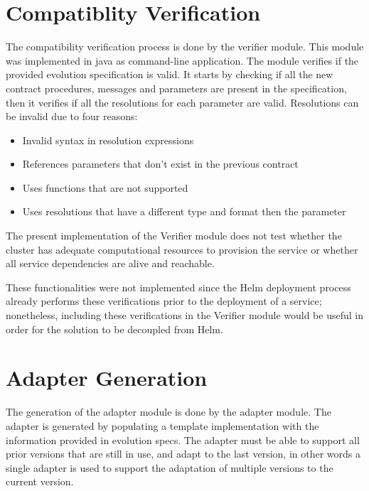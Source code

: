 \section{Compatiblity Verification} %
\label{sec:compatiblity_verification}

The compatibility verification process is done by the verifier module.
This module was implemented in java as command-line application.
The module verifies if the provided evolution specification is valid.
It starts by checking if all the new contract procedures, messages and parameters are present in the specification,
then it verifies if all the resolutions for each parameter are valid.
Resolutions can be invalid due to four reasons:

\begin{itemize}
    \item Invalid syntax in resolution expressions
    \item References parameters that don't exist in the previous contract
    \item Uses functions that are not supported
    \item Uses resolutions that have a different type and format then the parameter
\end{itemize}

The present implementation of the Verifier module does not test whether the cluster has adequate computational resources to provision the service or whether all service dependencies are alive and reachable.

These functionalities were not implemented since the Helm deployment process already performs these verifications prior to the deployment of a service;
nonetheless, including these verifications in the Verifier module would be useful in order for the solution to be decoupled from Helm.

\newpage

\section{Adapter Generation} %
\label{sec:adapter_generation}

The generation of the adapter module is done by the adapter module.
The adapter is generated by populating a template implementation with the information provided in evolution specs.
The adapter must be able to support all prior versions that are still in use, and adapt to the last version, in other words
a single adapter is used to support the adaptation of multiple versions to the current version.

